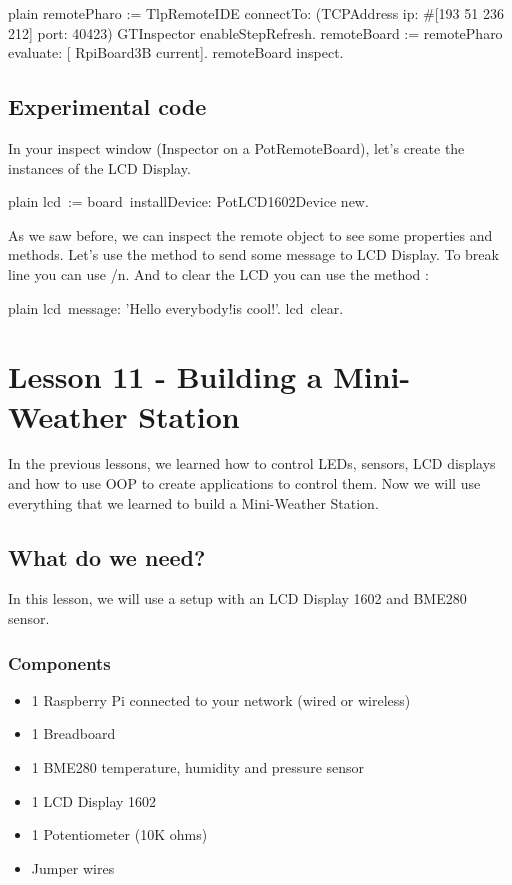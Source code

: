 \documentclass[10pt,twoside,english]{_support/latex/sbabook/sbabook}
\begin{document}
\begin{displaycode}{plain}
remotePharo := TlpRemoteIDE connectTo: (TCPAddress ip: #[193 51 236 212] port: 40423)
GTInspector enableStepRefresh.
remoteBoard := remotePharo evaluate: [ RpiBoard3B current].
remoteBoard inspect.
\end{displaycode}
\section{Experimental code}
In your inspect window (Inspector on a PotRemoteBoard), let’s create the instances of the LCD Display. 

\begin{displaycode}{plain}
lcd := board installDevice: PotLCD1602Device new.
\end{displaycode}

As we saw before, we can inspect the remote object to see some properties and methods. Let's use the method  to send some message to LCD Display. To break line you can use /n. And to clear the LCD you can use the method :

\begin{displaycode}{plain}
lcd message: 'Hello everybody!\Pharo is cool!'. 
lcd clear.
\end{displaycode}
\chapter{Lesson 11 - Building a Mini-Weather Station}
In the previous lessons, we learned how to control LEDs, sensors, LCD displays and how to use OOP to create applications to control them. Now we will use everything that we learned to build a Mini-Weather Station. 
\section{What do we need?}
In this lesson, we will use a setup with an LCD Display 1602 and BME280 sensor.
\subsection{Components}
\begin{itemize}
\item 1 Raspberry Pi connected to your network (wired or wireless)
\item 1 Breadboard
\item 1 BME280 temperature, humidity and pressure sensor
\item 1 LCD Display 1602 
\item 1 Potentiometer (10K ohms)
\item Jumper wires
\end{itemize}
\end{document}
